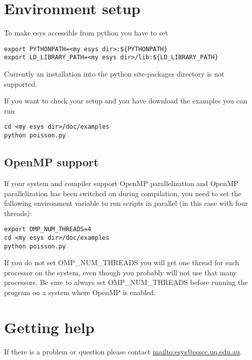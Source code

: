 \section{Environment setup}
To make esys accessible from python you have to set
\begin{verbatim}
export PYTHONPATH=<my esys dir>:${PYTHONPATH}
export LD_LIBRARY_PATH=<my esys dir>/lib:${LD_LIBRARY_PATH}
\end{verbatim}
Currently an installation into the python site-packages directory is not supported.

If you want to check your setup and you have download the examples you can run
\begin{verbatim}
cd <my esys dir>/doc/examples
python poisson.py
\end{verbatim}

\subsection{OpenMP support}

If your system and compiler support OpenMP parallelization and OpenMP parallelization has been switched on during compilation, you need to set the following environment variable to run scripts in parallel (in this case with four threads):
\begin{verbatim}
export OMP_NUM_THREADS=4
cd <my esys dir>/doc/examples
python poisson.py
\end{verbatim}

If you do not set OMP_NUM_THREADS you will get one thread for each processor on the system, even though you probably will not use that many processors. Be sure to always set OMP_NUM_THREADS before running the program on a system where OpenMP is enabled.

\section{Getting help}
If there is a problem or question please contact \url{mailto:esys@esscc.uq.edu.au}.
